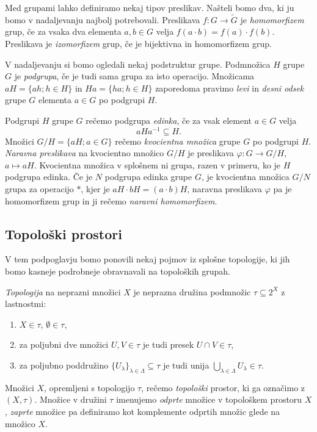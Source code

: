 \documentclass[mat1]{fmfdelo}
\begin{document}
Med grupami lahko definiramo nekaj tipov preslikav. Našteli bomo dva, ki ju bomo v nadaljevanju najbolj potrebovali.
Preslikava $f\colon G \to \widetilde{G}$ je \emph{homomorfizem} grup, če za vsaka dva elementa $a, b \in G$ velja $f(a\cdot b) = f(a)\cdot f(b)$.
Preslikava je \emph{izomorfizem} grup, če je bijektivna in homomorfizem grup.

V nadaljevanju si bomo ogledali nekaj podstruktur grupe.
Podmnožica $H$ grupe $G$ je \emph{podgrupa}, če je tudi sama grupa za isto operacijo.
Množicama $aH = \lbrace ah ; h \in H \rbrace$ in $Ha = \lbrace ha ; h \in H \rbrace$ zaporedoma pravimo \emph{levi} in \emph{desni odsek} grupe $G$ elementa $a \in G$ po podgrupi $H$.

Podgrupi $H$ grupe $G$ rečemo podgrupa \emph{edinka}, če za vsak element $a \in G$ velja \[aHa^{-1} \subseteq H.\]
Množici $G/H = \lbrace aH ; a \in G \rbrace$ rečemo \emph{kvocientna množica} grupe $G$ po podgrupi $H$.
\emph{Naravna preslikava} na kvocientno množico $G/H$ je preslikava $\varphi: G \to G/H$, $a \mapsto aH$.
Kvocientna množica v splošnem ni grupa, razen v primeru, ko je $H$ podgrupa edinka.
Če je $N$ podgrupa edinka grupe $G$, je kvocientna množica $G/N$ grupa za operacijo $*$, kjer je $aH\cdot bH = (a\cdot b)H$, naravna preslikava $\varphi$ pa je homomorfizem grup in ji rečemo \emph{naravni homomorfizem}.

\subsection{Topološki prostori}
V tem podpoglavju bomo ponovili nekaj pojmov iz splo\-šne topologije, ki jih bomo kasneje podrobneje obravnavali na topoloških grupah.

\emph{Topologija} na neprazni množici $X$ je neprazna družina podmnožic $\tau \subseteq 2^X$ z lastnostmi:
\begin{enumerate}
\item $X \in \tau$, $\emptyset \in \tau$,
\item za poljubni dve množici $U,V \in \tau$ je tudi presek $U \cap V \in \tau$,
\item za poljubno poddružino $\lbrace U_{\lambda} \rbrace_{\lambda \in \Lambda} \subseteq \tau$ je tudi unija $\bigcup\limits_{\lambda \in \Lambda}^{} U_{\lambda} \in \tau$.
\end{enumerate}
Množici $X$, opremljeni s topologijo $\tau$, rečemo \emph{topološki} prostor, ki ga označimo z $(X, \tau)$. Množice v družini $\tau$ imenujemo \emph{odprte} množice v topološkem prostoru $X$, \emph{zaprte} množice pa definiramo kot komplemente odprtih množic glede na množico $X$.
\end{document}
